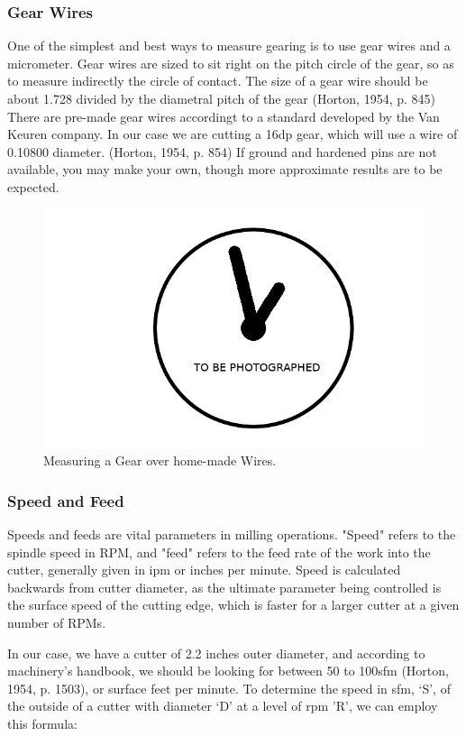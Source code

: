 \documentclass[12pt,twoside,letterpaper]{article}
\begin{document}
 
\subsubsection{Gear Wires}
One of the simplest and best ways to measure gearing is to use gear wires and a micrometer. Gear wires are sized to sit right on the pitch circle of the gear, so as to measure indirectly the circle of contact. The size of a gear wire should be about 1.728 divided by the diametral pitch of the gear (Horton, 1954, p. 845) There are pre-made gear wires accordingt to a standard developed by the Van Keuren company. In our case we are cutting a 16dp gear, which will use a wire of 0.10800 diameter. (Horton, 1954, p. 854)  If ground and hardened pins are not available, you may make your own, though more approximate results are to be expected. 
\begin{figure}[H]
\centering
\includegraphics[width=5in]{imgpending}
	\caption{Measuring a Gear over home-made Wires.}
\end{figure}

\subsubsection{Speed and Feed}

Speeds and feeds are vital parameters in milling operations. "Speed" refers to the spindle speed in RPM, and "feed" refers to the feed rate of the work into the cutter, generally given in ipm or inches per minute. Speed is calculated backwards from cutter diameter, as the ultimate parameter being controlled is the surface speed of the cutting edge, which is faster for a larger cutter at a given number of RPMs.

In our case, we have a cutter of 2.2 inches outer diameter, and according to machinery's handbook, we should be looking for between 50 to 100sfm (Horton, 1954, p. 1503), or surface feet per minute. To determine the speed in sfm, `S', of the outside of a cutter with diameter `D' at a level of rpm 'R', we can employ this formula:
\end{document}
